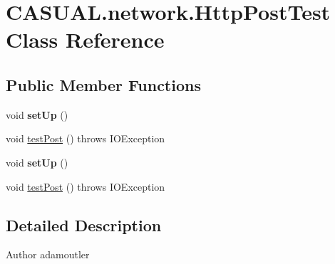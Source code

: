\hypertarget{class_c_a_s_u_a_l_1_1network_1_1_http_post_test}{\section{C\-A\-S\-U\-A\-L.\-network.\-Http\-Post\-Test Class Reference}
\label{class_c_a_s_u_a_l_1_1network_1_1_http_post_test}
}
\subsection*{Public Member Functions}
\begin{DoxyCompactItemize}
\item 
\hypertarget{class_c_a_s_u_a_l_1_1network_1_1_http_post_test_a17f01728d66d3d5533946763460f423f}{void {\bfseries set\-Up} ()}\label{class_c_a_s_u_a_l_1_1network_1_1_http_post_test_a17f01728d66d3d5533946763460f423f}

\item 
void \hyperlink{class_c_a_s_u_a_l_1_1network_1_1_http_post_test_acf2f9f84b8121c7978ca208a30f72392}{test\-Post} ()  throws I\-O\-Exception 
\item 
\hypertarget{class_c_a_s_u_a_l_1_1network_1_1_http_post_test_a17f01728d66d3d5533946763460f423f}{void {\bfseries set\-Up} ()}\label{class_c_a_s_u_a_l_1_1network_1_1_http_post_test_a17f01728d66d3d5533946763460f423f}

\item 
void \hyperlink{class_c_a_s_u_a_l_1_1network_1_1_http_post_test_acf2f9f84b8121c7978ca208a30f72392}{test\-Post} ()  throws I\-O\-Exception 
\end{DoxyCompactItemize}


\subsection{Detailed Description}
\begin{DoxyAuthor}{Author}
adamoutler 
\end{DoxyAuthor}


